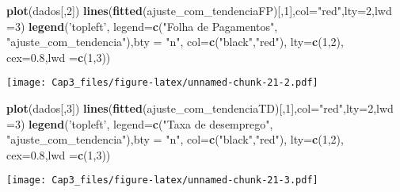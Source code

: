 \documentclass[]{article}
\newenvironment{Shaded}{\begin{snugshade}}{\end{snugshade}}
\newcommand{\DataTypeTok}[1]{\textcolor[rgb]{0.13,0.29,0.53}{#1}}
\newcommand{\DecValTok}[1]{\textcolor[rgb]{0.00,0.00,0.81}{#1}}
\newcommand{\FloatTok}[1]{\textcolor[rgb]{0.00,0.00,0.81}{#1}}
\newcommand{\KeywordTok}[1]{\textcolor[rgb]{0.13,0.29,0.53}{\textbf{#1}}}
\newcommand{\NormalTok}[1]{#1}
\newcommand{\StringTok}[1]{\textcolor[rgb]{0.31,0.60,0.02}{#1}}
\begin{document}
\begin{Shaded}
\begin{Highlighting}[]
\KeywordTok{plot}\NormalTok{(dados[,}\DecValTok{2}\NormalTok{])}
\KeywordTok{lines}\NormalTok{(}\KeywordTok{fitted}\NormalTok{(ajuste_com_tendenciaFP)[,}\DecValTok{1}\NormalTok{],}\DataTypeTok{col=}\StringTok{"red"}\NormalTok{,}\DataTypeTok{lty=}\DecValTok{2}\NormalTok{,}\DataTypeTok{lwd =}\DecValTok{3}\NormalTok{)}
\KeywordTok{legend}\NormalTok{(}\StringTok{'topleft'}\NormalTok{, }\DataTypeTok{legend=}\KeywordTok{c}\NormalTok{(}\StringTok{"Folha de Pagamentos"}\NormalTok{, }\StringTok{"ajuste_com_tendencia"}\NormalTok{),}\DataTypeTok{bty =} \StringTok{"n"}\NormalTok{,}
       \DataTypeTok{col=}\KeywordTok{c}\NormalTok{(}\StringTok{"black"}\NormalTok{,}\StringTok{"red"}\NormalTok{), }\DataTypeTok{lty=}\KeywordTok{c}\NormalTok{(}\DecValTok{1}\NormalTok{,}\DecValTok{2}\NormalTok{), }\DataTypeTok{cex=}\FloatTok{0.8}\NormalTok{,}\DataTypeTok{lwd =}\KeywordTok{c}\NormalTok{(}\DecValTok{1}\NormalTok{,}\DecValTok{3}\NormalTok{))}
\end{Highlighting}
\end{Shaded}

\texttt{[image: Cap3\_files/figure-latex/unnamed-chunk-21-2.pdf]}

\begin{Shaded}
\begin{Highlighting}[]
\KeywordTok{plot}\NormalTok{(dados[,}\DecValTok{3}\NormalTok{])}
\KeywordTok{lines}\NormalTok{(}\KeywordTok{fitted}\NormalTok{(ajuste_com_tendenciaTD)[,}\DecValTok{1}\NormalTok{],}\DataTypeTok{col=}\StringTok{"red"}\NormalTok{,}\DataTypeTok{lty=}\DecValTok{2}\NormalTok{,}\DataTypeTok{lwd =}\DecValTok{3}\NormalTok{)}
\KeywordTok{legend}\NormalTok{(}\StringTok{'topleft'}\NormalTok{, }\DataTypeTok{legend=}\KeywordTok{c}\NormalTok{(}\StringTok{"Taxa de desemprego"}\NormalTok{, }\StringTok{"ajuste_com_tendencia"}\NormalTok{),}\DataTypeTok{bty =} \StringTok{"n"}\NormalTok{,}
       \DataTypeTok{col=}\KeywordTok{c}\NormalTok{(}\StringTok{"black"}\NormalTok{,}\StringTok{"red"}\NormalTok{), }\DataTypeTok{lty=}\KeywordTok{c}\NormalTok{(}\DecValTok{1}\NormalTok{,}\DecValTok{2}\NormalTok{), }\DataTypeTok{cex=}\FloatTok{0.8}\NormalTok{,}\DataTypeTok{lwd =}\KeywordTok{c}\NormalTok{(}\DecValTok{1}\NormalTok{,}\DecValTok{3}\NormalTok{))}
\end{Highlighting}
\end{Shaded}

\texttt{[image: Cap3\_files/figure-latex/unnamed-chunk-21-3.pdf]}
\end{document}
